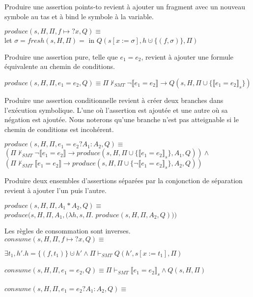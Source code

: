 \documentclass[11pt,openany]{article}
\begin{document}
	Produire une assertion points-to revient \`a ajouter un fragment avec un nouveau symbole au tas et \`a bind le symbole \`a la variable.
	\begin{center}
		$produce(s,H,\Pi,f\mapsto?x,Q)\equiv$\\
		let $\sigma=fresh(s,H,\Pi)=$ in $Q(s[x:=\sigma],h\cupdot\{(f,\sigma)\},\Pi)$
	\end{center}
	Produire une assertion pure, telle que $e_1 = e_2$, revient \`a ajouter une formule \'equivalente au chemin de conditions.
	\begin{center}
		$produce(s,H,\Pi,e_1 = e_2,Q)\equiv\Pi\not\vdash_{SMT}\neg\llbracket e_1 = e_2\rrbracket\rightarrow Q(s,H,\Pi\cup\{\llbracket e_1 = e_2\rrbracket_s\})$
	\end{center}
	Produire une assertion conditionnelle revient \`a cr\'eer deux branches dans l'ex\'ecution symbolique. L'une o\`u l'assertion est ajout\'ee et une autre o\`u sa n\'egation est ajout\'ee. Nous noterons qu'une branche n'est pas atteignable si le chemin de conditions est incoh\'erent.
	\begin{center}
		$produce(s,H,\Pi,e_1 = e_2?A_1:A_2,Q)\equiv$\\
		$(\Pi\not\vdash_{SMT}\neg\llbracket e_1 = e_2\rrbracket\rightarrow produce(s,H,\Pi\cup\{\llbracket e_1 = e_2\rrbracket_s\},A_1,Q))\land$\\
		$(\Pi\not\vdash_{SMT}\llbracket e_1 = e_2\rrbracket\rightarrow produce(s,H,\Pi\cup\{\neg\llbracket e_1 = e_2\rrbracket_s\},A_2,Q))$
	\end{center}
	Produire deux ensembles d'assertions s\'epar\'ees par la conjonction de s\'eparation revient \`a ajouter l'un puis l'autre.
	\begin{center}
		$produce(s,H,\Pi,A_1*A_2,Q)\equiv$\\
		$produce(s,H,\Pi,A_1,(\lambda h,s,\Pi.$ $produce(s,H,\Pi,A_2,Q)))$
	\end{center}
	
	Les r\`egles de consommation sont inverses.\\
	$consume(s,H,\Pi,f\mapsto?x,Q)\equiv$
	
	$\exists t_1,h'. h = \{(f,t_1)\}\cupdot h'\land \Pi\vdash_{SMT} Q(h',s[x:=t_1],\Pi)$\\ \\
		$consume(s,H,\Pi,e_1=e_2,Q)\equiv\Pi\vdash_{SMT}\llbracket e_1=e_2\rrbracket_s\land Q(s,H,\Pi)$\\ \\
		$consume(s,H,\Pi,e_1=e_2?A_1:A_2,Q)\equiv$ 
		
\end{document}
